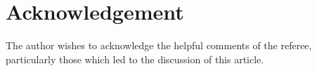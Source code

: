 

\section{Acknowledgement}
\label{sec.Acknow}

The author wishes to acknowledge the helpful comments of the referee,
particularly those which led to the discussion of this article.

